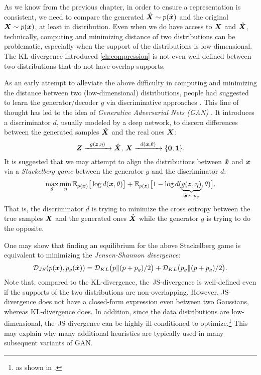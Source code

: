 \documentclass[\toplevelprefix/book-main.tex]{subfiles}
\begin{document}
As we know from the previous chapter, in order to ensure a representation is consistent, we need to compare the generated $\hat {\bm{X}} \sim p(\hat{\bm{x}})$ and the original $\bm{X} \sim p(\bm{x})$, at least in distribution. Even when we do have access to $\bm{X}$ and $\hat {\bm{X}}$, technically, computing and minimizing distance of two distributions can be problematic, especially when the support of the distributions is low-dimensional. The KL-divergence introduced \ref{ch:compression} is not even well-defined between two distributions that do not have overlap supports. 

As an early attempt to alleviate the above difficulty in computing and minimizing the distance between two (low-dimensional)  distributions, people had suggested to learn the generator/decoder $g$ via discriminative approaches \cite{Tu-2007}. This line of thought has led to  the idea of {\em Generative Adversarial Nets (GAN)} \cite{goodfellow2014generative}. It introduces a discriminator $d$, usually modeled by a deep network, to discern differences between the generated samples $\hat {\bm{X}}$ and the real ones $\bm{X}$:
\begin{equation}
 \bm{Z} \xrightarrow{\hspace{2mm} g(\bm{z},\eta) \hspace{2mm}} \hat {\bm{X}}, \, \bm{X} \xrightarrow{\hspace{2mm} d(\bm{x}, \theta)\hspace{2mm}} \{\mathbf 0, \mathbf 1\}.
 \label{eqn:GAN}
\end{equation}
It is suggested that we may attempt to align the distributions between $\hat {\bm{x}}$ and $\bm{x}$ via a {\em Stackelberg game} between the generator $g$ and the discriminator $d$:
\begin{equation}
\max_{\theta}\min_{\eta} \mathbb{E}_{p({\bm{x}})}\big[\log d(\bm{x},\theta)\big] + \mathbb{E}_{p({\bm{z}})}\big[1 - \log d(\underbrace{g(\bm{z},\eta)}_{\hat {\bm{x}} \,\sim\, p_g},\theta)\big].
\end{equation}
That is, the discriminator $d$ is trying to minimize the cross entropy between the true samples $\bm{X}$ and the generated ones $\hat {\bm{X}}$ while the generator $g$ is trying to do  the opposite. 

One may show that finding an equilibrium for the above Stackelberg game is equivalent to minimizing the {\em Jensen-Shannon divergence}:
\begin{equation}
    \mathcal{D}_{JS}(p(\bm{x}), p_g(\hat {\bm{x}})) = \mathcal{D}_{KL}\big(p \| (p + p_g)/{2}\big) + \mathcal{D}_{KL}\big(p_g \| (p + p_g)/{2}\big).
\end{equation}
Note that, compared to the KL-divergence, the~JS-divergence is well-defined even if the supports of the two distributions are non-overlapping. However, JS-divergence does not have a closed-form expression even between two Gaussians, whereas KL-divergence does. In addition, since the data distributions are low-dimensional, the~JS-divergence can be highly ill-conditioned to optimize.\footnote{as shown in \cite{arjovsky2017wasserstein}.} This may explain why many additional heuristics are typically used in many subsequent variants of GAN. 
\end{document}
